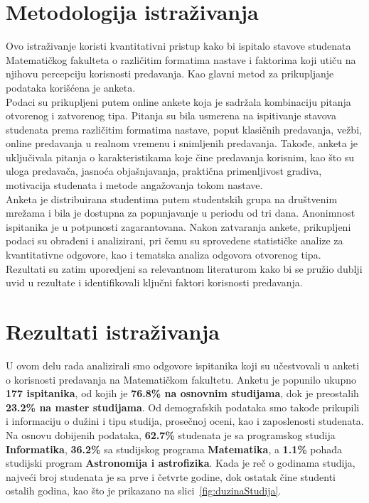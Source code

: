 \documentclass{article}
\begin{document}
\section{Metodologija istraživanja}
Ovo istraživanje koristi kvantitativni pristup kako bi ispitalo stavove studenata Matematičkog fakulteta o različitim formatima nastave i faktorima koji utiču na njihovu percepciju korisnosti predavanja. Kao glavni metod za prikupljanje podataka korišćena je anketa.
\\
Podaci su prikupljeni putem online ankete koja je sadržala kombinaciju pitanja otvorenog i zatvorenog tipa. Pitanja su bila usmerena na ispitivanje stavova studenata prema različitim formatima nastave, poput klasičnih predavanja, vežbi, online predavanja u realnom vremenu i snimljenih predavanja. Takođe, anketa je uključivala pitanja o karakteristikama koje čine predavanja korisnim, kao što su uloga predavača, jasnoća objašnjavanja, praktična primenljivost gradiva, motivacija studenata i metode angažovanja tokom nastave.
\\
Anketa je distribuirana studentima putem studentskih grupa na društvenim mrežama i bila je dostupna za popunjavanje u periodu od tri dana. Anonimnost ispitanika je u potpunosti zagarantovana. Nakon zatvaranja ankete, prikupljeni podaci su obrađeni i analizirani, pri čemu su sprovedene statističke analize za kvantitativne odgovore, kao i tematska analiza odgovora otvorenog tipa. Rezultati su zatim uporedjeni sa relevantnom literaturom kako bi se pružio dublji uvid u rezultate i identifikovali ključni faktori korisnosti predavanja.
\section{Rezultati istraživanja}

U ovom delu rada analizirali smo odgovore ispitanika koji su učestvovali u anketi o korisnosti predavanja na Matematičkom fakultetu. Anketu je popunilo ukupno \textbf{177 ispitanika}, od kojih je \textbf{76.8\% na osnovnim studijama}, dok je preostalih \textbf{23.2\% na master studijama}. Od demografskih podataka smo takođe prikupili i informaciju o dužini i tipu studija, prosečnoj oceni, kao i zaposlenosti studenata. Na osnovu dobijenih podataka, \textbf{62.7\%} studenata je sa programskog studija \textbf{Informatika}, \textbf{36.2\%} sa studijskog programa \textbf{Matematika}, a \textbf{1.1\%} pohađa studijski program \textbf{Astronomija i astrofizika}. Kada je reč o godinama studija, najveći broj studenata je sa prve i četvrte godine, dok ostatak čine studenti ostalih godina, kao što je prikazano na slici~\ref{fig:duzinaStudija}.
\end{document}
